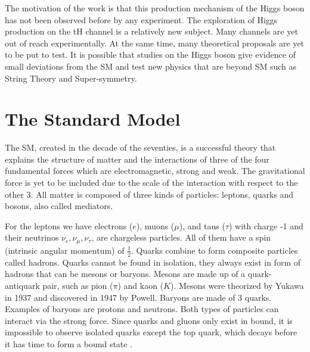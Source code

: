 The motivation of the work is that this production mechanism of the Higgs boson has not been observed before by any experiment. The exploration of Higgs production on the tH channel is a relatively new subject. %
Many channels are yet out of
reach experimentally. At the same time, many theoretical
proposals are yet to be put to test. It is possible that studies on the Higgs boson give evidence of small deviations from the SM and test new physics that are beyond SM such as String Theory and Super-symmetry. 

\section{The Standard Model} %
The SM, created in the decade of the seventies, is a successful theory that explains the structure of matter and the interactions of three of the four fundamental forces which are electromagnetic, strong and weak. The gravitational force is yet to be included due to the scale of the interaction with respect to the other 3. All matter is composed of three kinds of particles: leptons, quarks and bosons, also called mediators.

For the leptons we have electrons ($e$), muons ($\mu$), and taus ($\tau$) with charge -1 and their neutrinos $\nu_e, \nu_\mu, \nu_\tau$, are chargeless particles. %
 All of them have a spin (intrinsic angular momentum) of $\frac{1}{2}$\cite{griff}. %
 Quarks combine to form composite particles called hadrons. Quarks cannot be found in isolation, they always exist in form of hadrons that can be mesons or baryons. Mesons are made up of a quark-antiquark pair, such as pion ($\pi$) and kaon ($K$). Mesons were theorized by Yukawa in 1937 and discovered in 1947 by Powell\cite{griff}.
Baryons are made of 3 quarks. Examples of baryons are protons and neutrons. Both types of particles can interact via the strong force. Since quarks and gluons only exist in bound, it is impossible to observe isolated quarks except the top quark, which decays before it has time to form a
bound state \cite{gross}.

